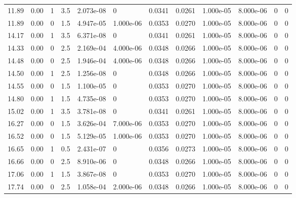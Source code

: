 \documentclass[preview]{standalone}
\begin{document}
{{\begin{tabular}{L{1.2cm}C{1.2cm} C{0.3cm}C{0.5cm} C{1.4cm}C{1.4cm} C{1.4cm}C{1.4cm} C{1.6cm}C{1.6cm} C{1.6cm}C{1.6cm}}
  11.89  &  0.00  & 1     & 3.5 &  2.073e-08  & 0  &  0.0341&   0.0261& 1.000e-05 & 8.000e-06   &  0 & 0  \\ 
  11.89  &  0.00  & 0     & 1.5 &  4.947e-05  & 1.000e-06  &  0.0353&   0.0270& 1.000e-05 & 8.000e-06   &  0 & 0  \\ 
  14.17  &  0.00  & 1     & 3.5 &  6.371e-08  & 0  &  0.0341&   0.0261& 1.000e-05 & 8.000e-06   &  0 & 0  \\ 
  14.33  &  0.00  & 0     & 2.5 &  2.169e-04  & 4.000e-06  &  0.0348&   0.0266& 1.000e-05 & 8.000e-06   &  0 & 0  \\ 
  14.48  &  0.00  & 0     & 2.5 &  1.946e-04  & 4.000e-06  &  0.0348&   0.0266& 1.000e-05 & 8.000e-06   &  0 & 0  \\ 
  14.50  &  0.00  & 1     & 2.5 &  1.256e-08  & 0  &  0.0348&   0.0266& 1.000e-05 & 8.000e-06   &  0 & 0  \\ 
  14.55  &  0.00  & 0     & 1.5 &  1.100e-05  & 0  &  0.0353&   0.0270& 1.000e-05 & 8.000e-06   &  0 & 0  \\ 
  14.80  &  0.00  & 1     & 1.5 &  4.735e-08  & 0  &  0.0353&   0.0270& 1.000e-05 & 8.000e-06   &  0 & 0  \\ 
  15.02  &  0.00  & 1     & 3.5 &  3.781e-08  & 0  &  0.0341&   0.0261& 1.000e-05 & 8.000e-06   &  0 & 0  \\ 
  16.27  &  0.00  & 0     & 1.5 &  3.626e-04  & 7.000e-06  &  0.0353&   0.0270& 1.000e-05 & 8.000e-06   &  0 & 0  \\ 
  16.52  &  0.00  & 0     & 1.5 &  5.129e-05  & 1.000e-06  &  0.0353&   0.0270& 1.000e-05 & 8.000e-06   &  0 & 0  \\ 
  16.65  &  0.00  & 1     & 0.5 &  2.431e-07  & 0  &  0.0356&   0.0273& 1.000e-05 & 8.000e-06   &  0 & 0  \\ 
  16.66  &  0.00  & 0     & 2.5 &  8.910e-06  & 0  &  0.0348&   0.0266& 1.000e-05 & 8.000e-06   &  0 & 0  \\ 
  17.06  &  0.00  & 1     & 1.5 &  3.867e-08  & 0  &  0.0353&   0.0270& 1.000e-05 & 8.000e-06   &  0 & 0  \\ 
  17.74  &  0.00  & 0     & 2.5 &  1.058e-04  & 2.000e-06  &  0.0348&   0.0266& 1.000e-05 & 8.000e-06   &  0 & 0  \\ 
\hline 
\end{tabular} 

}}
\end{document}
